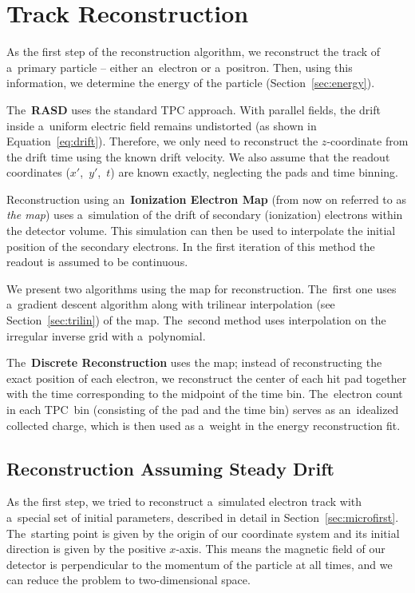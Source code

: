 \chapter{Track Reconstruction}
\label{sec:track}
	As the first step of the reconstruction algorithm, we reconstruct the track of a~primary particle -- either an~electron or a~positron. Then, using this information, we determine the energy of the particle (Section~\ref{sec:energy}).
	
	The~\textbf{\acf{RASD}} uses the standard \ac{TPC} approach. With parallel fields, the drift inside a~uniform electric field remains undistorted (as shown in Equation~\ref{eq:drift}). Therefore, we only need to reconstruct the $z$\nobreakdash-coordinate from the drift time using the known drift velocity. We also assume that the readout coordinates ($x'$,~$y'$,~$t$) are known exactly, neglecting the pads and time binning.
	
	Reconstruction using an~\textbf{Ionization Electron Map} (from now on referred to as \emph{the map}) uses a~simulation of the drift of secondary (ionization) electrons within the detector volume. This simulation can then be used to interpolate the initial position of the secondary electrons. In the first iteration of this method the readout is assumed to be continuous.
	
	We present two algorithms using the map for reconstruction. The~first one uses a~gradient descent algorithm along with trilinear interpolation (see Section~\ref{sec:trilin}) of the map. The~second method uses interpolation on the irregular inverse grid with a~polynomial.
	
	The~\textbf{Discrete Reconstruction} uses the map; instead of reconstructing the exact position of each electron, we reconstruct the center of each hit pad together with the time corresponding to the midpoint of the time bin. The~electron count in each \ac{TPC}~bin (consisting of the pad and the time bin) serves as an~idealized collected charge, which is then used as a~weight in the energy reconstruction fit.
	
	\section{Reconstruction Assuming Steady Drift}
	\label{sec:trackfirst}
		As the first step, we tried to reconstruct a~simulated electron track with a~special set of initial parameters, described in detail in Section~\ref{sec:microfirst}. The~starting point is given by the origin of our coordinate system and its initial direction is given by the positive $x$\nobreakdash-axis. This means the magnetic field of our detector is perpendicular to the momentum of the particle at all times, and we can reduce the problem to two-dimensional space.
		
